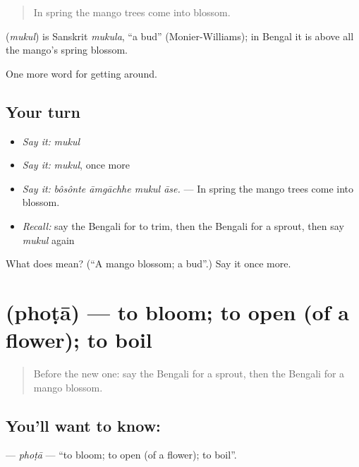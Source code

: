 \begin{quote}
In spring the mango trees come into blossom.
\end{quote}

\begin{cousinweb}
\textbf{} (\emph{mukul}) is Sanskrit \emph{mukula}, \textquotedblleft{}a bud\textquotedblright{} (Monier-Williams); in Bengal it is above all the mango's spring blossom.
\end{cousinweb}

\begin{grammarlens}[title={What you've built}]
One more word for getting around.
\end{grammarlens}

\subsection*{Your turn}
\begin{itemize}
\raggedright
  \item \emph{Say it:} \emph{mukul}
  \item \emph{Say it:} \emph{mukul}, once more
  \item \emph{Say it:} \emph{bôsônte āmgāchhe mukul āse.} — In spring the mango trees come into blossom.
  \item \emph{Recall:} say the Bengali for to trim, then the Bengali for a sprout, then say \emph{mukul} again
\end{itemize}

\begin{tcolorbox}[breakable,colback=teal!4,colframe=teal!35!black,title={Before you move on}]
What does  mean? (\textquotedblleft{}A mango blossom; a bud\textquotedblright{}.) Say it once more.
\end{tcolorbox}
\section[\texorpdfstring{\bn{ফোটা} (phoṭā)}{ফোটা (phoṭā)}]{ (phoṭā) — to bloom; to open (of a flower); to boil}

\label{lesson:BN-C436-phota}



\begin{quote}
Before the new one: say the Bengali for a sprout, then the Bengali for a mango blossom.
\end{quote}

\subsection*{You'll want to know: }
\textbf{} — \emph{phoṭā} — \textquotedblleft{}to bloom; to open (of a flower); to boil\textquotedblright{}.

